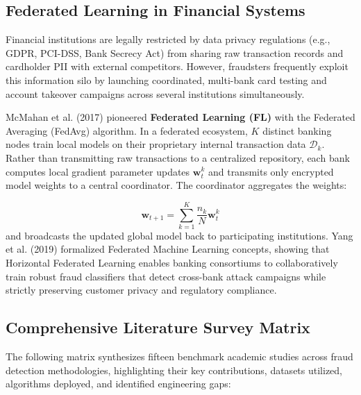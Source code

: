 \documentclass[12pt,a4paper,oneside]{report}
\begin{document}
\subsection{Federated Learning in Financial Systems}

Financial institutions are legally restricted by data privacy regulations (e.g., GDPR, PCI-DSS, Bank Secrecy Act) from sharing raw transaction records and cardholder PII with external competitors. However, fraudsters frequently exploit this information silo by launching coordinated, multi-bank card testing and account takeover campaigns across several institutions simultaneously.


McMahan et al. (2017) pioneered \textbf{Federated Learning (FL)} with the Federated Averaging (FedAvg) algorithm. In a federated ecosystem, $K$ distinct banking nodes train local models on their proprietary internal transaction data $\mathcal{D}_k$. Rather than transmitting raw transactions to a centralized repository, each bank computes local gradient parameter updates $\mathbf{w}_t^k$ and transmits only encrypted model weights to a central coordinator. The coordinator aggregates the weights:

\begin{equation}
\mathbf{w}_{t+1} = \sum_{k=1}^K \frac{n_k}{N} \mathbf{w}_t^k
\end{equation}
and broadcasts the updated global model back to participating institutions. Yang et al. (2019) formalized Federated Machine Learning concepts, showing that Horizontal Federated Learning enables banking consortiums to collaboratively train robust fraud classifiers that detect cross-bank attack campaigns while strictly preserving customer privacy and regulatory compliance.



\subsection{Comprehensive Literature Survey Matrix}

The following matrix synthesizes fifteen benchmark academic studies across fraud detection methodologies, highlighting their key contributions, datasets utilized, algorithms deployed, and identified engineering gaps:
\end{document}
